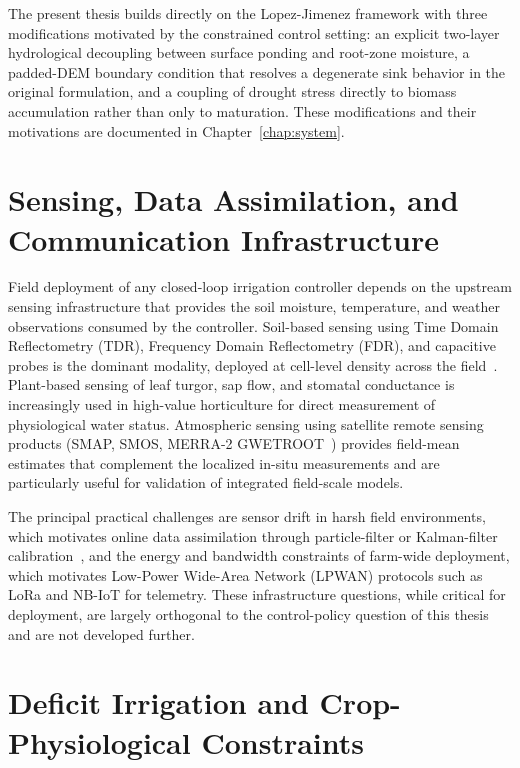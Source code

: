 The present thesis builds directly on the Lopez-Jimenez framework with
three modifications motivated by the constrained control setting: an
explicit two-layer hydrological decoupling between surface ponding
and root-zone moisture, a padded-DEM boundary condition that resolves
a degenerate sink behavior in the original formulation, and a coupling
of drought stress directly to biomass accumulation rather than only to
maturation. These modifications and their motivations are documented
in Chapter~\ref{chap:system}.

\section{Sensing, Data Assimilation, and Communication Infrastructure}
\label{sec:lit-sensing}

Field deployment of any closed-loop irrigation controller depends on
the upstream sensing infrastructure that provides the soil moisture,
temperature, and weather observations consumed by the controller.
Soil-based sensing using Time Domain Reflectometry (TDR), Frequency
Domain Reflectometry (FDR), and capacitive probes is the dominant
modality, deployed at cell-level density across the
field~\cite{Sharma2025,Bayar2025}. Plant-based sensing of leaf
turgor, sap flow, and stomatal conductance is increasingly used in
high-value horticulture for direct measurement of physiological water
status. Atmospheric sensing using satellite remote sensing products
(SMAP, SMOS, MERRA-2 GWETROOT~\cite{Afrasiabikia2026}) provides
field-mean estimates that complement the localized in-situ
measurements and are particularly useful for validation of integrated
field-scale models.

The principal practical challenges are sensor drift in harsh field
environments, which motivates online data assimilation through
particle-filter or Kalman-filter calibration~\cite{Maniam2026}, and
the energy and bandwidth constraints of farm-wide deployment, which
motivates Low-Power Wide-Area Network (LPWAN) protocols such as LoRa
and NB-IoT for telemetry. These infrastructure questions, while
critical for deployment, are largely orthogonal to the control-policy
question of this thesis and are not developed further.

\section{Deficit Irrigation and Crop-Physiological Constraints}
\label{sec:lit-deficit}

